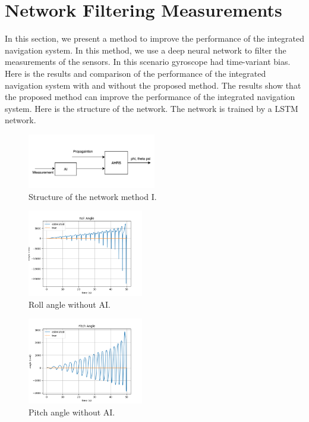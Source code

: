 \documentclass[conference]{IEEEtran}
\begin{document}
\section{Network Filtering Measurements}
    In this section, we present a method to improve the performance of the integrated navigation system. In this method, we use a deep neural network to filter the measurements of the sensors. In this scenario gyroscope had time-variant bias. Here is the results and comparison of the performance of the integrated navigation system with and without the proposed method. The results show that the proposed method can improve the performance of the integrated navigation system. Here is the structure of the network. The network is trained by a LSTM network.
    \begin{figure}[H]
        \centerline{\includegraphics[width=0.5\textwidth]{../Figures/part_1_network.png}}
        \caption{Structure of the network method I.}
    \end{figure}
    \begin{figure}[H]
        \centerline{\includegraphics[width=0.45\textwidth]{../Figures/part_1_roll_no_AI.png}}
        \caption{Roll angle without AI.}
    \end{figure}
    \begin{figure}[H]
        \centerline{\includegraphics[width=0.45\textwidth]{../Figures/part_1_pitch_no_AI.png}}
        \caption{Pitch angle without AI.}
    \end{figure}
\end{document}
